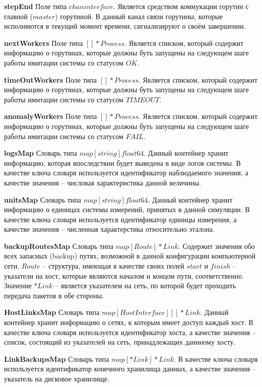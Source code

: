 \textbf{stepEnd}        
Поле типа $chan interface{}$. Является средством коммукации горутин с главной ($master$) горутиной. В данный канал связи горутины, которые исполняются в текущий момент времени, сигнализируют о своём завершении.

\textbf{nextWorkers}
Поле типа $[]*Process$. Является списком, который содержит информацию о горутинах, которые должны буть запущены на следующем шаге работы имитации системы со статусом $OK$.

\textbf{timeOutWorkers}   
Поле типа $[]*Process$. Является списком, который содержит информацию о горутинах, которые должны буть запущены на следующем шаге работы имитации системы со статусом $TIMEOUT$.

\textbf{anomalyWorkers}   
Поле типа $[]*Process$. Является списком, который содержит информацию о горутинах, которые должны буть запущены на следующем шаге работы имитации системы со статусом $FAIL$.

\textbf{logsMap}  
Словарь типа $map[string]float64$. Данный контейнер хранит информацию, которая впоследствии будет выведена в виде логов системы.  В качестве ключа словаря используется идентификатор наблюдаемого значения, а качестве значения -- числовая характеристика данной величины.

\textbf{unitsMap} 
Словарь типа $map[string]float64$. Данный контейнер хранит информацию о единицах системы измерений, принятых в данной симуляции. В качестве ключа словаря используется идентификатор единицы измерения, а качестве значения -- численная характерстика относительно эталона.

\textbf{backupRoutesMap} 
Словарь типа  $map[Route]*Link$. Содержит значения обо всех запасных (backup) путях, возможной в данной конфигурации компьютерной сети. $Route$ -- структура, имеющая в качестве своих полей $start$ и $finish$ -- указатели на хост, которые являются началом и концом пути, соответственно. Значение $*Link$ -- является указателем на сеть, по которой будет проходить передача пакетов в обе стороны.

\textbf{HostLinksMap}
Словарь типа $map[HostInterface][]*Link$. Данный контейнер хранит информацию о сетях, к которым имеет доступ каждый хост. В качестве ключа словаря используется идентификатор хоста, а качестве значения -- список, состоящий из указателей на сеть, принадлежащих даннному хосту.

\textbf{LinkBackupsMap}  
Словарь типа $map[*Link]*Link$.  В качестве ключа словаря используется идентификатор конечного хранилища данных, а качестве значения -- указатель на дисковое хранилище.


